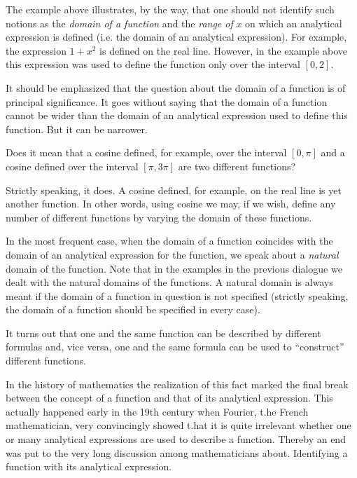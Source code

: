 {The example above illustrates, by the way, that one should not identify such notions as the \emph{domain of a function} and the \emph{range of} $x$ on which an analytical expression is defined (i.e. the domain of an analytical expression). For example, the expression $1 + x^{2}$ is defined on the real line. However, in the example above this expression was used to define the function only over the interval $[0, 2]$.

It should be emphasized that the question about the domain of a function is of principal significance. It goes without saying that the domain of a function cannot be wider than the domain of an analytical expression used to define this
function. But it can be narrower.

\rdr Does it mean that a cosine defined, for example, over the interval $[0, \pi]$ and a cosine defined over the interval $[\pi, 3\pi]$ are two different functions?

\athr Strictly speaking, it does. A cosine defined, for example, on the real line is yet another function. In other words, using cosine we may, if we wish, define any number of different functions by varying the domain of these functions. 

In the most frequent case, when the domain of a function coincides with the domain of an analytical expression for the function, we speak about a \emph{natural} domain of the function. Note that in the examples in the previous dialogue we dealt with the natural domains of the functions. A natural domain is always meant if the domain of a function in question is not specified (strictly speaking, the domain of a function should be specified in every case).

\rdr It turns out that one and the same function can be described by different formulas and, vice versa, one and the same formula can be used to ``construct'' different functions.

\athr In the history of mathematics the realization of this fact marked the final break between the concept of a function and that of its analytical expression. This actually happened early in the 19th century when Fourier, t.he French mathematician, very convincingly showed t.hat it is quite irrelevant whether one or many analytical expressions are used to describe a function. Thereby an end was put to the very long discussion among mathematicians about. Identifying a function with its analytical expression.

}
